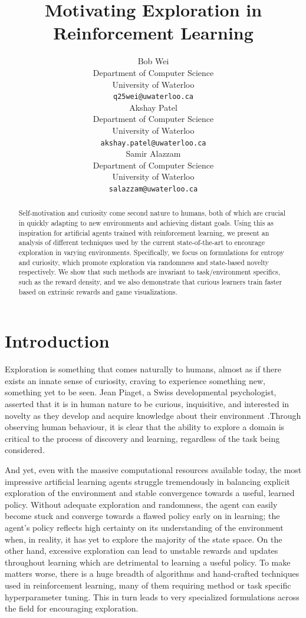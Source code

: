\documentclass{article}
\title{Motivating Exploration in Reinforcement Learning}
\author{
  Bob Wei\\
  Department of Computer Science\\
  University of Waterloo\\
  \texttt{q25wei@uwaterloo.ca} \\
  \And
  Akshay Patel \\
  Department of Computer Science\\
  University of Waterloo\\
  \texttt{akshay.patel@uwaterloo.ca} \\
  \AND
  Samir Alazzam \\
  Department of Computer Science\\
  University of Waterloo\\
  \texttt{salazzam@uwaterloo.ca} \\
}
\begin{document}
\maketitle

\begin{abstract}
Self-motivation and curiosity come second nature to humans, both of which are crucial in quickly adapting to new environments and achieving distant goals. Using this as inspiration for artificial agents trained with reinforcement learning, we present an analysis of different techniques used by the current state-of-the-art to encourage exploration in varying environments. Specifically, we focus on formulations for entropy and curiosity, which promote exploration via randomness and state-based novelty respectively. We show that such methods are invariant to task/environment specifics, such as the reward density, and we also demonstrate that curious learners train faster based on extrinsic rewards and game visualizations.
\end{abstract}

\section{Introduction}

Exploration is something that comes naturally to humans, almost as if there exists an innate sense of curiosity, craving to experience something new, something yet to be seen. Jean Piaget, a Swiss developmental psychologist, asserted that it is in human nature to be curious, inquisitive, and interested in novelty as they develop and acquire knowledge about their environment \cite{piaget}.Through observing human behaviour, it is clear that the ability to explore a domain is critical to the process of discovery and learning, regardless of the task being considered.

And yet, even with the massive computational resources available today, the most impressive artificial learning agents struggle tremendously in balancing explicit exploration of the environment and stable convergence towards a useful, learned policy. Without adequate exploration and randomness, the agent can easily become stuck and converge towards a flawed policy early on in learning; the agent's policy reflects high certainty on its understanding of the environment when, in reality, it has yet to explore the majority of the state space. On the other hand, excessive exploration can lead to unstable rewards and updates throughout learning which are detrimental to learning a useful policy. To make matters worse, there is a huge breadth of algorithms and hand-crafted techniques used in reinforcement learning, many of them requiring method or task specific hyperparameter tuning. This in turn leads to very specialized formulations across the field for encouraging exploration.
\end{document}
